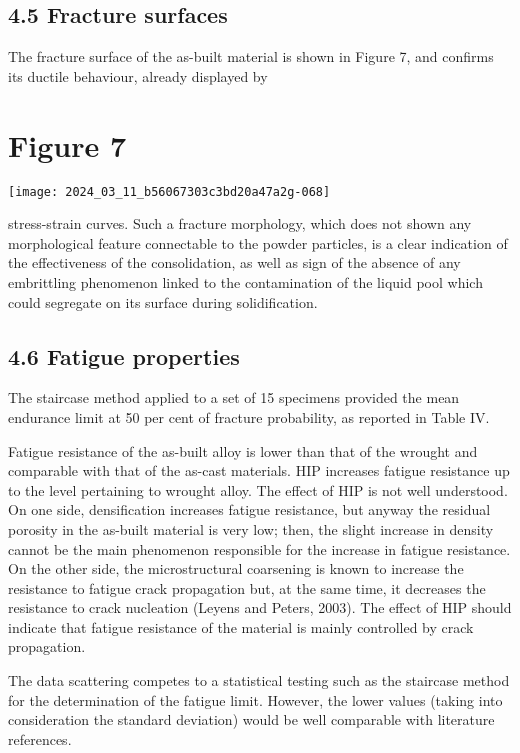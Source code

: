 \documentclass[10pt]{article}
\begin{document}
\subsection*{4.5 Fracture surfaces}
The fracture surface of the as-built material is shown in Figure 7, and confirms its ductile behaviour, already displayed by

\section*{Figure 7}
\begin{center}
\texttt{[image: 2024\_03\_11\_b56067303c3bd20a47a2g-068]}
\end{center}

stress-strain curves. Such a fracture morphology, which does not shown any morphological feature connectable to the powder particles, is a clear indication of the effectiveness of the consolidation, as well as sign of the absence of any embrittling phenomenon linked to the contamination of the liquid pool which could segregate on its surface during solidification.

\subsection*{4.6 Fatigue properties}
The staircase method applied to a set of 15 specimens provided the mean endurance limit at 50 per cent of fracture probability, as reported in Table IV.

Fatigue resistance of the as-built alloy is lower than that of the wrought and comparable with that of the as-cast materials. HIP increases fatigue resistance up to the level pertaining to wrought alloy. The effect of HIP is not well understood. On one side, densification increases fatigue resistance, but anyway the residual porosity in the as-built material is very low; then, the slight increase in density cannot be the main phenomenon responsible for the increase in fatigue resistance. On the other side, the microstructural coarsening is known to increase the resistance to fatigue crack propagation but, at the same time, it decreases the resistance to crack nucleation (Leyens and Peters, 2003). The effect of HIP should indicate that fatigue resistance of the material is mainly controlled by crack propagation.

The data scattering competes to a statistical testing such as the staircase method for the determination of the fatigue limit. However, the lower values (taking into consideration the standard deviation) would be well comparable with literature references.
\end{document}

